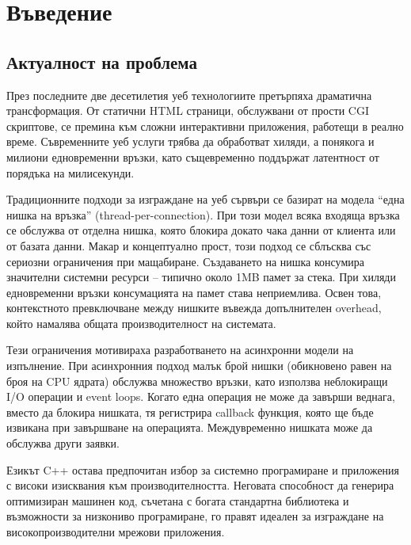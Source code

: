 \section{Въведение}

\subsection{Актуалност на проблема}

През последните две десетилетия уеб технологиите претърпяха драматична трансформация. От статични HTML страници, обслужвани от прости CGI скриптове, се премина към сложни интерактивни приложения, работещи в реално време. Съвременните уеб услуги трябва да обработват хиляди, а понякога и милиони едновременни връзки, като същевременно поддържат латентност от порядъка на милисекунди.

Традиционните подходи за изграждане на уеб сървъри се базират на модела ``една нишка на връзка'' (thread-per-connection). При този модел всяка входяща връзка се обслужва от отделна нишка, която блокира докато чака данни от клиента или от базата данни. Макар и концептуално прост, този подход се сблъсква със сериозни ограничения при мащабиране. Създаването на нишка консумира значителни системни ресурси -- типично около 1MB памет за стека. При хиляди едновременни връзки консумацията на памет става неприемлива. Освен това, контекстното превключване между нишките въвежда допълнителен overhead, който намалява общата производителност на системата.

Тези ограничения мотивираха разработването на асинхронни модели на изпълнение. При асинхронния подход малък брой нишки (обикновено равен на броя на CPU ядрата) обслужва множество връзки, като използва неблокиращи I/O операции и event loops. Когато една операция не може да завърши веднага, вместо да блокира нишката, тя регистрира callback функция, която ще бъде извикана при завършване на операцията. Междувременно нишката може да обслужва други заявки.

Езикът C++ остава предпочитан избор за системно програмиране и приложения с високи изисквания към производителността. Неговата способност да генерира оптимизиран машинен код, съчетана с богата стандартна библиотека и възможности за низкониво програмиране, го правят идеален за изграждане на високопроизводителни мрежови приложения.

